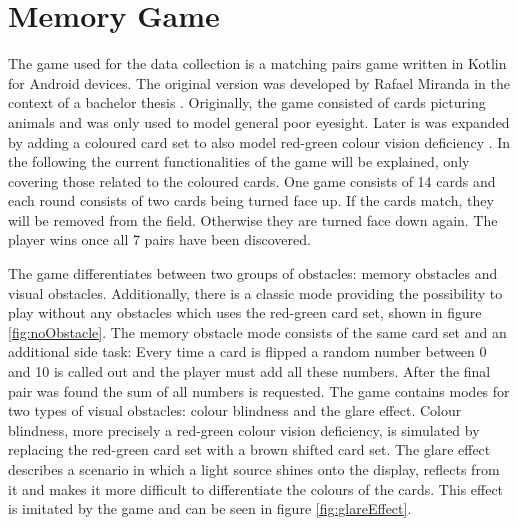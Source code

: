 \chapter{Memory Game}
\label{memory_game}


The game used for the data collection is a matching pairs game written in Kotlin for Android devices. The original version was developed by Rafael Miranda in the context of a bachelor thesis \cite{Mir}. Originally, the game consisted of cards picturing animals and was only used to model general poor eyesight. Later is was expanded by adding a coloured card set to also model red-green colour vision deficiency \cite[p.~7]{Markus}. In the following the current functionalities of the game will be explained, only covering those related to the coloured cards. One game consists of 14 cards and each round consists of two cards being turned face up. If the cards match, they will be removed from the field. Otherwise they are turned face down again. The player wins once all 7 pairs have been discovered. 

The game differentiates between two groups of obstacles: memory obstacles and visual obstacles. Additionally, there is a classic mode providing the possibility to play without any obstacles which uses the red-green card set, shown in figure \ref{fig:noObstacle}. The memory obstacle mode consists of the same card set and an additional side task: Every time a card is flipped a random number between 0 and 10 is called out and the player must add all these numbers. After the final pair was found the sum of all numbers is requested. The game contains modes for two types of visual obstacles: colour blindness and the glare effect. Colour blindness, more precisely a red-green colour vision deficiency, is simulated by replacing the red-green card set with a brown shifted card set. The glare effect describes a scenario in which a light source shines onto the display, reflects from it and makes it more difficult to differentiate the colours of the cards. This effect is imitated by the game and can be seen in figure \ref{fig:glareEffect}. 

